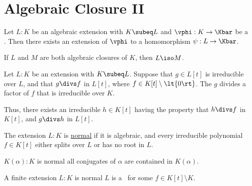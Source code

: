 \documentclass[a4paper]{article}
\begin{document}
\section{Algebraic Closure II}
\begin{ttheorem}
  Let \( L:K \) be an algebraic extension with \( K\subeq L \) and \( \vphi:K\to\Kbar \) be a \homo.
  Then there exists an extension of \( \vphi \) to a homomorphism \( \psi:L\to\Kbar \).
\end{ttheorem}

\begin{ttheorem}
  If \( L \) and \( M \) are both algebraic closures of \( K \), then \( L \iso M \).
\end{ttheorem}

\begin{tcorollary}
  Let \( L:K \) be an extension with \( K\subeq L \).
  Suppose that \( g\in L[t] \) is irreducible over \( L \), and that \( g\divs f \) in \( L[t] \), where \( f\in K[t]\setminus \lt\{ 0 \rt\} \).
  The \( g \) divides a factor of \( f \) that is irreducible over \( K \).

  Thus, there exists an irreducible \( h\in K[t] \) having the property that \( h\divs f \) in \( K[t] \), and \( g\divs h \) in \( L[t] \).
\end{tcorollary}

\begin{tdefinition}
  The extension \( L:K \) is \ul{normal} if it is algebraic, and every irreducible polynomial \( f\in K[t] \) either splits over \( L \) or has no root in \( L \).
\end{tdefinition}

\begin{ttheorem}
  \( K(\alpha):K \) is normal \iff all conjugates of \( \alpha \) are contained in \( K(\alpha) \).
\end{ttheorem}

\begin{ttheorem}
  A finite extension \( L:K \) is normal \iff \( L \) is a \sfe~for some \( f\in K[t]\setminus K \).
\end{ttheorem}
\end{document}
